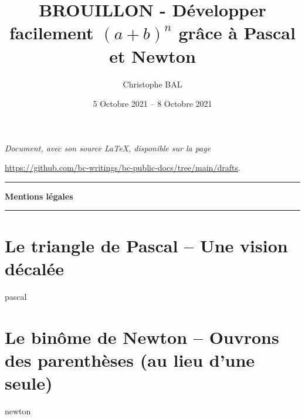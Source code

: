 \documentclass[12pt]{amsart}
\begin{document}

\title{BROUILLON - Développer facilement $(a + b)^n$ grâce à Pascal et Newton}
\author{Christophe BAL}
\date{5 Octobre 2021 -- 8 Octobre 2021}

\maketitle

\begin{center}
	\itshape
	Document, avec son source \LaTeX, disponible sur la page

	\url{https://github.com/bc-writings/bc-public-docs/tree/main/drafts}.
\end{center}


\bigskip


\begin{center}
	\hrule\vspace{.3em}
	{
		\fontsize{1.35em}{1em}\selectfont
		\textbf{Mentions \og légales \fg}
	}

	\vspace{0.45em}
	\doclicenseThis
	\hrule
\end{center}


\bigskip


\setcounter{tocdepth}{1}
\tableofcontents



\section{Le triangle de Pascal -- Une vision décalée}

{pascal}



\section{Le binôme de Newton -- Ouvrons des parenthèses (au lieu d'une seule)}

{newton}
\end{document}
